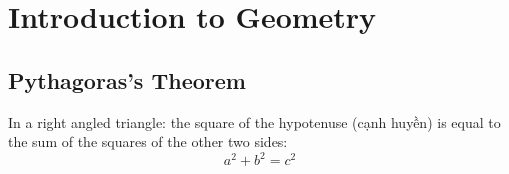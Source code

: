 \chapter{Introduction to Geometry}

\section{Pythagoras's Theorem}

In a right angled triangle: the square of the hypotenuse (cạnh huyền) is equal to the sum of the squares of the other two sides:$$a^2 + b^2 = c^2$$

